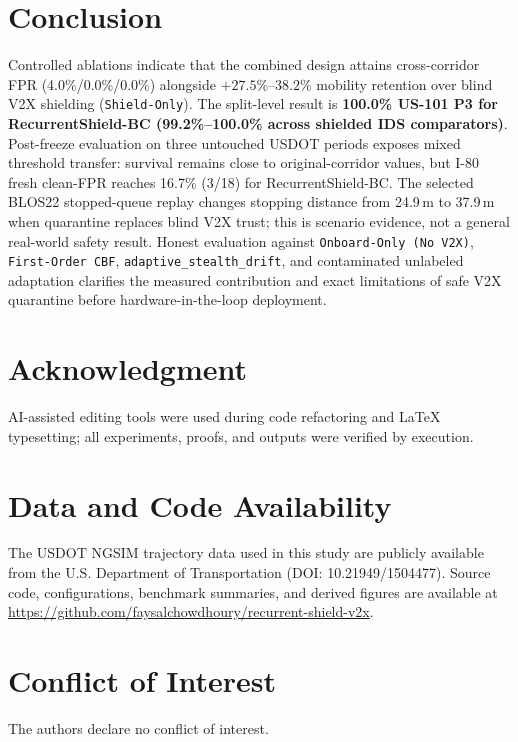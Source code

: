 \documentclass[journal]{IEEEtran}
\begin{document}
\section{Conclusion}
Controlled ablations indicate that the combined design attains cross-corridor FPR (4.0\%/0.0\%/0.0\%) alongside $+27.5\%$--$38.2\%$ mobility retention over blind V2X shielding (\texttt{Shield-Only}). The split-level result is \textbf{100.0\% US-101 P3 for RecurrentShield-BC (99.2\%--100.0\% across shielded IDS comparators)}. Post-freeze evaluation on three untouched USDOT periods exposes mixed threshold transfer: survival remains close to original-corridor values, but I-80 fresh clean-FPR reaches 16.7\% (3/18) for RecurrentShield-BC. The selected BLOS22 stopped-queue replay changes stopping distance from 24.9\,m to 37.9\,m when quarantine replaces blind V2X trust; this is scenario evidence, not a general real-world safety result. Honest evaluation against \texttt{Onboard-Only (No V2X)}, \texttt{First-Order CBF}, \texttt{adaptive\_stealth\_drift}, and contaminated unlabeled adaptation clarifies the measured contribution and exact limitations of safe V2X quarantine before hardware-in-the-loop deployment.

\section*{Acknowledgment}
AI-assisted editing tools were used during code refactoring and LaTeX typesetting; all experiments, proofs, and outputs were verified by execution.

\section*{Data and Code Availability}
The USDOT NGSIM trajectory data used in this study are publicly available from the U.S. Department of Transportation (DOI: 10.21949/1504477). Source code, configurations, benchmark summaries, and derived figures are available at \url{https://github.com/faysalchowdhoury/recurrent-shield-v2x}.

\section*{Conflict of Interest}
The authors declare no conflict of interest.
\end{document}

